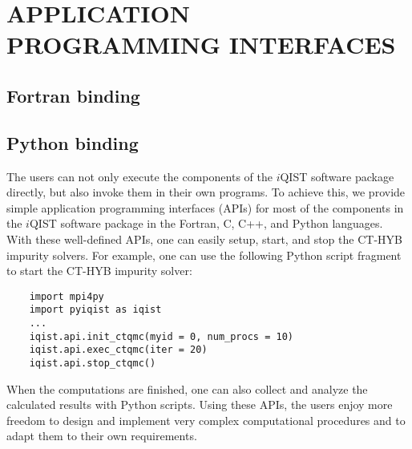 \chapter{APPLICATION PROGRAMMING INTERFACES}
\section{Fortran binding}
\section{Python binding}
The users can not only execute the components of the $i$QIST software package directly, but also invoke them in their own programs. To achieve this, we provide simple application programming interfaces (APIs) for most of the components in the $i$QIST software package in the Fortran, C, C++, and Python languages. With these well-defined APIs, one can easily setup, start, and stop the CT-HYB impurity solvers. For example, one can use the following Python script fragment to start the CT-HYB impurity solver:
\begin{verbatim}
    import mpi4py
    import pyiqist as iqist
    ...
    iqist.api.init_ctqmc(myid = 0, num_procs = 10)
    iqist.api.exec_ctqmc(iter = 20)
    iqist.api.stop_ctqmc()
\end{verbatim}
When the computations are finished, one can also collect and analyze the calculated results with Python scripts. Using these APIs, the users enjoy more freedom to design and implement very complex computational procedures and to adapt them to their own requirements.
